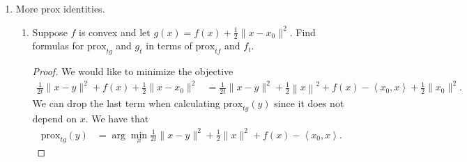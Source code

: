 \documentclass[11pt]{amsart}
\newcommand{\prox}{\mathrm{prox}}
\begin{document}
\begin{enumerate}
\begin{enumerate}
  \begin{proof}
    We can use a similar strategy as the previous problem and treat each term
    separately. In this case, we have that
    \begin{equation*}
      \frac{1}{2t}\|x-y\|^2 + \delta_{\mathbb{B}_{\infty}}(x)
      = \sum_{i=1}^n\left[
        \frac{1}{2t}\left(x_i - y_i\right)^2
        +
        \delta_{[-1,1]}(x_i)
        \right].
      \end{equation*}

      For each term, we have that
      \begin{equation*}
        \frac{1}{2t}\left(x_i - y_i\right)^2 + \delta_{[-1,1]}(x_i) = \begin{cases}
          \frac{1}{2t}\left(x_i - y_i\right)^2, &x_i \in [-1, 1]; \\
          \infty, &\text{otherwise}.
        \end{cases}
      \end{equation*}
      This can easily be seen to be minimized by $x_i = y_i$ when
      $y_i \in [-1, 1]$, $x_i = 1$ when $y_i > 1$ and $x_i = -1$, when
      $y_i < -1$, so we have that
      \begin{equation*}
        \left[\prox_{t f}(y)\right]_i = \begin{cases}
          y_i, & y_i \in [-1, 1]; \\
          -1, & y_i < -1; \\
          1, & y_i > 1.
        \end{cases}
      \end{equation*}      
    \end{proof}
\end{enumerate}

\item More prox identities. 
\begin{enumerate}

\item Suppose $f$ is convex and let $g(x) = f(x) + \frac{1}{2}\|x-x_0\|^2$. 
  Find formulas for $\prox_{t g}$ and $g_t$ in terms of $\prox_{t f}$ and $f_t$.

  \begin{proof}
    We would like to minimize the objective
    \begin{align*}
      \frac{1}{2t}\|x-y\|^2 + f(x) + \frac{1}{2}\|x-x_0\|^2
      &= \frac{1}{2t}\|x-y\|^2 + \frac{1}{2}\left\|x\right\|^2 + f(x) -
        \left\langle x_0, x \right\rangle + \frac{1}{2}\|x_0\|^2.
    \end{align*}
    We can drop the last term when calculating $\prox_{t g}(y)$ since it does
    not depend on $x$. We have that
    \begin{align*}
      \prox_{t g}(y)
      &= \arg\min_x \frac{1}{2t}\|x-y\|^2 + \frac{1}{2}\|x\|^2 + f(x)        
        - \left\langle x_0, x \right\rangle.
    \end{align*}


\end{proof}
\end{enumerate}
\end{enumerate}
\end{document}
